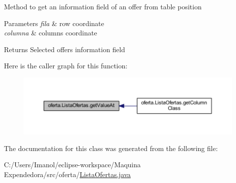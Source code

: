 Method to get an information field of an offer from table position 
\begin{DoxyParams}{Parameters}
{\em fila} & row coordinate \\
\hline
{\em columna} & columns coordinate \\
\hline
\end{DoxyParams}
\begin{DoxyReturn}{Returns}
Selected offer\textquotesingle{}s information field 
\end{DoxyReturn}
Here is the caller graph for this function\+:
\nopagebreak
\begin{figure}[H]
\begin{center}
\leavevmode
\includegraphics[width=350pt]{classoferta_1_1_lista_ofertas_a31d3834ba593c933f612572a942fc601_icgraph}
\end{center}
\end{figure}


The documentation for this class was generated from the following file\+:\begin{DoxyCompactItemize}
\item 
C\+:/\+Users/\+Imanol/eclipse-\/workspace/\+Maquina Expendedora/src/oferta/\mbox{\hyperlink{_lista_ofertas_8java}{Lista\+Ofertas.\+java}}\end{DoxyCompactItemize}
